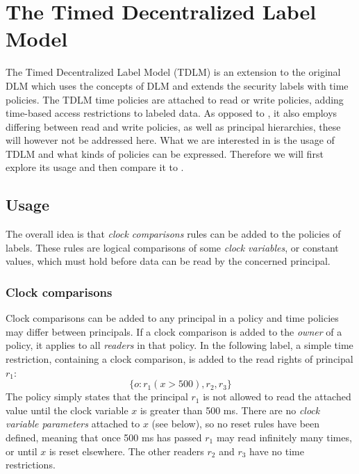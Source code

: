
\newcommand{\tat}{\;@\;} %
\newcommand{\tdor}{\;||\;} %
\newcommand{\tdand}{\;\&\&\;} %

\section{The Timed Decentralized Label Model}
The Timed Decentralized Label Model (TDLM) \cite{pedersen2015} is an extension to the original DLM which uses the concepts of DLM and extends the security labels with time policies.
The TDLM time policies are attached to read or write policies, adding time-based access restrictions to labeled data.
As opposed to \thelang, it also employs differing between read and write policies, as well as principal hierarchies, these will however not be addressed here.
What we are interested in is the usage of TDLM and what kinds of policies can be expressed.
Therefore we will first explore its usage and then compare it to \thelang.

\subsection{Usage}
The overall idea is that \emph{clock comparisons} rules can be added to the policies of labels.
These rules are logical comparisons of some \emph{clock variables}, or constant values, which must hold before data can be read by the concerned principal.

\subsubsection{Clock comparisons}
Clock comparisons can be added to any principal in a policy and time policies may differ between principals.
If a clock comparison is added to the \emph{owner} of a policy, it applies to all \emph{readers} in that policy.
In the following label, a simple time restriction, containing a clock comparison, is added to the read rights of principal $r_1$:
  \[ \{ o : r_1(x > 500), r_2, r_3 \} \]
The policy simply states that the principal $r_1$ is not allowed to read the attached value until the clock variable $x$ is greater than 500 ms.
There are no \emph{clock variable parameters} attached to $x$ (see below), so no reset rules have been defined, meaning that once 500 ms has passed $r_1$ may read infinitely many times, or until $x$ is reset elsewhere.
The other readers $r_2$ and $r_3$ have no time restrictions.

